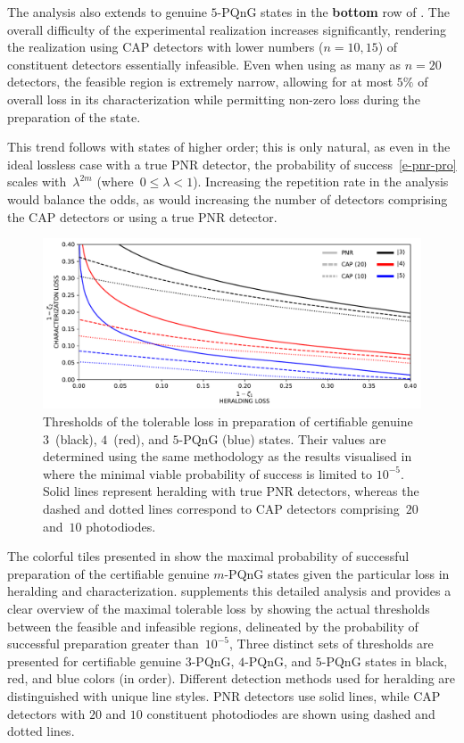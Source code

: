 \documentclass{article}
\begin{document}
The analysis also extends to genuine $5$-PQnG states in the \textbf{bottom} row of . The overall difficulty of the experimental realization increases significantly, rendering the realization using CAP detectors with lower numbers (${n = 10, 15}$) of constituent detectors essentially infeasible. Even when using as many as $n = 20$ detectors, the feasible region is extremely narrow, allowing for at most $5\%$ of overall loss in its characterization while permitting non-zero loss during the preparation of the state.

This trend follows with states of higher order; this is only natural, as even in the ideal lossless case with a true PNR detector, the probability of success~\eqref{e-pnr-pro} scales with~${\lambda^{2m}}$ (where~${0 \leq \lambda < 1}$). Increasing the repetition rate in the analysis would balance the odds, as would increasing the number of detectors comprising the CAP detectors or using a true PNR detector.

\begin{figure}[h]
  \begin{center}
    \includegraphics[width = \columnwidth]{import/202504/curves_unified_03_04_05.pdf}
  \end{center}
  \caption{
    Thresholds of the tolerable loss in preparation of certifiable genuine $3$~(black), $4$~(red), and $5$-PQnG (blue) states. Their values are determined using the same methodology as the results visualised in  where the minimal viable probability of success is limited to $10^{-5}$.
    Solid lines represent heralding with true PNR detectors, whereas the dashed and dotted lines correspond to CAP detectors comprising~$20$ and~$10$ photodiodes.
  }
  \label{f-thr-345}
\end{figure}

The colorful tiles presented in  show the maximal probability of successful preparation of the certifiable genuine $m$-PQnG states given the particular loss in heralding and characterization.  supplements this detailed analysis and provides a clear overview of the maximal tolerable loss by showing the actual thresholds between the feasible and infeasible regions, delineated by the probability of successful preparation greater than~$10^{-5}$, 
%
Three distinct sets of thresholds are presented for certifiable genuine $3$-PQnG, $4$-PQnG, and $5$-PQnG states in black, red, and blue colors (in order). Different detection methods used for heralding are distinguished with unique line styles. PNR detectors use solid lines, while CAP detectors with $20$ and $10$ constituent photodiodes are shown using dashed and dotted lines.
\end{document}
